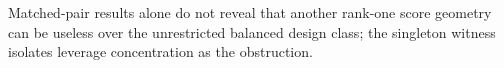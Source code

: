 Matched-pair results alone do not reveal that another rank-one score geometry can be useless over the unrestricted balanced design class; the singleton witness isolates leverage concentration as the obstruction.